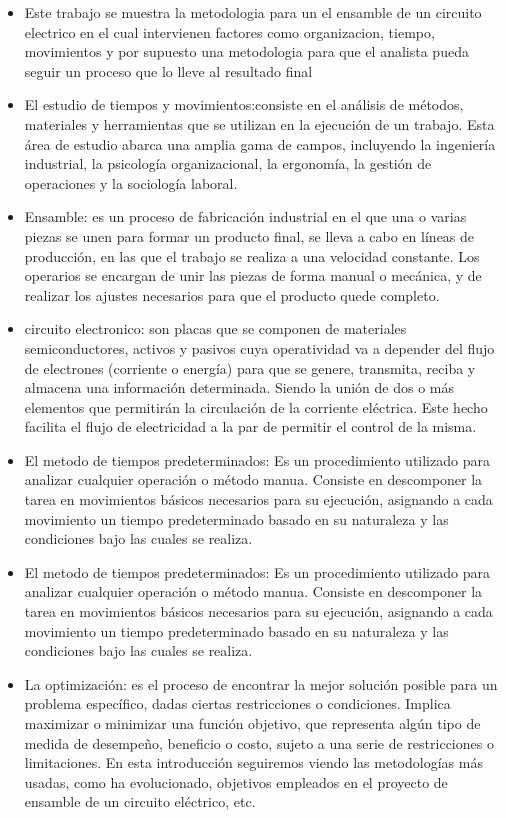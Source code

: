     \begin{itemize}
    \item Este trabajo se muestra la metodologia para un  el ensamble de un circuito electrico en el cual intervienen factores como organizacion, tiempo, movimientos y por supuesto una metodologia para que el analista pueda seguir un proceso que lo lleve al resultado final 
        \item El estudio de tiempos y movimientos:consiste  en el análisis de métodos, materiales y herramientas que se utilizan en la ejecución de un trabajo. Esta área de estudio abarca una amplia gama de campos, incluyendo la ingeniería industrial, la psicología organizacional, la ergonomía, la gestión de operaciones y la sociología laboral.
         \item  Ensamble: es un proceso de fabricación industrial en el que una o varias piezas se unen para formar un producto final, se lleva a cabo en líneas de producción, en las que el trabajo se realiza a una velocidad constante. Los operarios se encargan de unir las piezas de forma manual o mecánica, y de realizar los ajustes necesarios para que el producto quede completo.
       \item circuito electronico: son placas que se componen de materiales semiconductores, activos y pasivos cuya operatividad va a depender del flujo de electrones (corriente o energía) para que se  genere, transmita, reciba y almacena una información determinada. Siendo  la unión de dos o más elementos que permitirán la circulación de la corriente eléctrica. Este hecho facilita el flujo de electricidad a la par de permitir el control de la misma.
      \item El metodo de tiempos predeterminados: Es un procedimiento utilizado para analizar cualquier operación o método manua. Consiste en descomponer la tarea en movimientos básicos necesarios para su ejecución, asignando a cada movimiento un tiempo predeterminado basado en su naturaleza y las condiciones bajo las cuales se realiza.
     \item El metodo de tiempos predeterminados: Es un procedimiento utilizado para analizar cualquier operación o método manua. Consiste en descomponer la tarea en movimientos básicos necesarios para su ejecución, asignando a cada movimiento un tiempo predeterminado basado en su naturaleza y las condiciones bajo las cuales se realiza.
     \item La optimización: es el proceso de encontrar la mejor solución posible para un problema específico, dadas ciertas restricciones o condiciones. Implica maximizar o minimizar una función objetivo, que representa algún tipo de medida de desempeño, beneficio o costo, sujeto a una serie de restricciones o limitaciones. En esta introducción seguiremos viendo las metodologías más usadas, como ha evolucionado, objetivos empleados en el  proyecto de ensamble de un circuito eléctrico, etc.
    \end{itemize}
